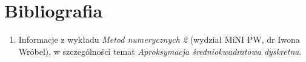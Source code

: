 \documentclass[12pt]{article}
\begin{document}
	
	
	\section{Bibliografia}
	\begin{enumerate}
		\item Informacje z wykładu \textit{Metod numerycznych 2} (wydział MiNI PW, dr Iwona Wróbel), w szczególności temat \textit{Aproksymacja średniokwadratowa dyskretna}.
	\end{enumerate}
	
\end{document}
